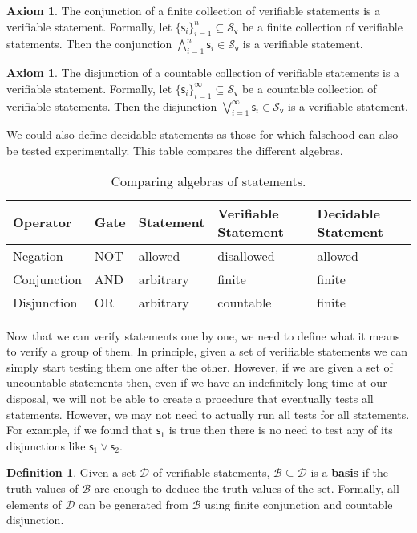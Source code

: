 \documentclass[letterpaper]{article}
\theoremstyle{plain}%
\theoremstyle{definition}
\newtheorem{defn}[thrm]{Definition}
\newtheorem{axiom}[thrm]{Axiom}
\theoremstyle{remark}
\numberwithin{equation}{section}
\def\vstmtSet{\mathcal{S}_\textsf{v}}
\def\bigAND{\bigwedge}
\def\OR{\vee}
\def\bigOR{\bigvee}
\newcommand{\stmt}[1][s] {\mathsf{#1}}
\newcommand{\edomain}[1][D] {\mathcal{#1}}
\newcommand{\basis}[1][B] {\mathcal{#1}} %
\begin{document}
\begin{axiom}\label{ax_verifiable_AND}
	The conjunction of a finite collection of verifiable statements is a verifiable statement. Formally, let $\{\stmt_i\}_{i=1}^{n} \subseteq \vstmtSet$ be a finite collection of verifiable statements. Then the conjunction $\bigAND\limits_{i=1}^{n} \stmt_i \in \vstmtSet$ is a verifiable statement.
\end{axiom}
	\begin{axiom}\label{ax_verifiable_OR}
	The disjunction of a countable collection of verifiable statements is a verifiable statement. Formally, let $\{\stmt_i\}_{i=1}^{\infty} \subseteq \vstmtSet$ be a countable collection of verifiable statements. Then the disjunction $\bigOR\limits_{i=1}^{\infty} \stmt_i \in \vstmtSet$ is a verifiable statement.
\end{axiom}

We could also define decidable statements as those for which falsehood can also be tested experimentally. This table compares the different algebras.

\begin{table}[h]
	\centering
	\begin{tabular}{p{} p{} p{} p{} p{}}
		Operator & Gate & Statement & Verifiable Statement & Decidable Statement  \\ 
		\hline 
		Negation & NOT & allowed & disallowed & allowed \\ 
		Conjunction & AND & arbitrary  & finite & finite \\ 
		Disjunction & OR & arbitrary  & countable & finite \\ 
	\end{tabular}
	\caption{Comparing algebras of statements.}
\end{table}

Now that we can verify statements one by one, we need to define what it means to verify a group of them. In principle, given a set of verifiable statements we can simply start testing them one after the other. However, if we are given a set of uncountable statements then, even if we have an indefinitely long time at our disposal, we will not be able to create a procedure that eventually tests all statements. However, we may not need to actually run all tests for all statements. For example, if we found that $\stmt_1$ is true then there is no need to test any of its disjunctions like $\stmt_1 \OR \stmt_2$.

\begin{defn}
	Given a set $\edomain$ of verifiable statements, $\basis \subseteq \edomain$ is a \textbf{basis} if the truth values of $\basis$ are enough to deduce the truth values of the set. Formally, all elements of $\edomain$ can be generated from $\basis$ using finite conjunction and countable disjunction.
\end{defn}
\end{document}
